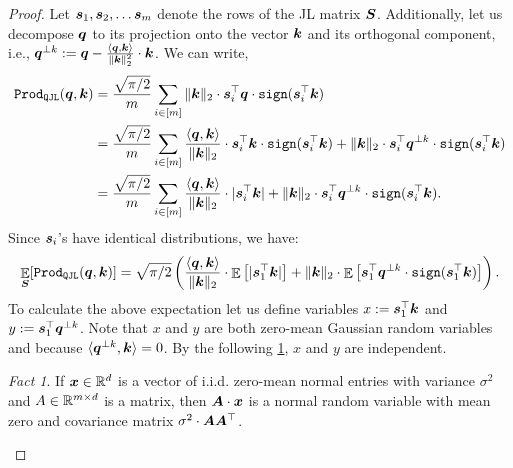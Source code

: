 \documentclass[11pt]{article}
\theoremstyle{plain}
\theoremstyle{definition}
\theoremstyle{remark}
\newcommand{\prodqjl}{\operatorname{{\tt Prod_{QJL}}}}
\newtheorem{fact}[theorem]{Fact}
\begin{document}
\begin{proof}
    Let $\s_1, \s_2, \ldots \s_m$ denote the rows of the JL matrix $\S$. 
    Additionally, let us decompose $\q$ to its projection onto the vector $\k$ and its orthogonal component, i.e., $\q^{\perp k} := \q - \frac{\langle \q, \k \rangle}{\|\k\|_2^2} \cdot \k $. 
    We can write,
    \begin{align*}
    \prodqjl(\q, \k) &= \frac{\sqrt{\pi/2}}{m} \sum_{i\in[m]} \| \k \|_2 \cdot \s_i^\top \q \cdot {\tt sign}(\s_i^\top \k) \\
    &= \frac{\sqrt{\pi/2}}{m} \sum_{i\in[m]} \frac{\langle \q, \k \rangle}{\|\k\|_2} \cdot \s_i^\top \k \cdot {\tt sign}(\s_i^\top \k) + \| \k \|_2 \cdot \s_i^\top \q^{\perp k}  \cdot {\tt sign}(\s_i^\top \k) \\
    &= \frac{\sqrt{\pi/2}}{m} \sum_{i\in[m]} \frac{\langle \q, \k \rangle}{\|\k\|_2} \cdot |\s_i^\top \k| + \| \k \|_2 \cdot \s_i^\top \q^{\perp k}  \cdot {\tt sign}(\s_i^\top \k).
    \end{align*}
    Since $\s_i$'s have identical distributions, we have:
    \begin{align*}
        \E_{\S} [\prodqjl(\q, \k)] = \sqrt{\pi/2} \left( \frac{\langle \q, \k \rangle}{\|\k\|_2} \cdot \E\left[ | \s_1^\top \k | \right] + \| \k \|_2 \cdot \E\left[ \s_1^\top \q^{\perp k} \cdot {\tt sign}(\s_1^\top \k)\right] \right).
    \end{align*}
    To calculate the above expectation let us define variables $x := \s_1^\top \k$ and $y := \s_1^\top \q^{\perp k}$. 
    Note that $x$ and $y$ are both zero-mean Gaussian random variables and because $\langle \q^{\perp k} , \k \rangle = 0$. By the following \cref{linear_transform_gaussian}, $x$ and $y$ are independent. 

    \begin{fact}\label{linear_transform_gaussian}
        If $\x \in \RR^d$ is a vector of i.i.d. zero-mean normal entries with variance $\sigma^2$ and $A \in \RR^{m \times d}$ is a matrix, then $\A\cdot \x$ is a normal random variable with mean zero and covariance matrix $\sigma^2 \cdot \A \A^\top$.
    \end{fact}
        

\end{proof}
\end{document}
